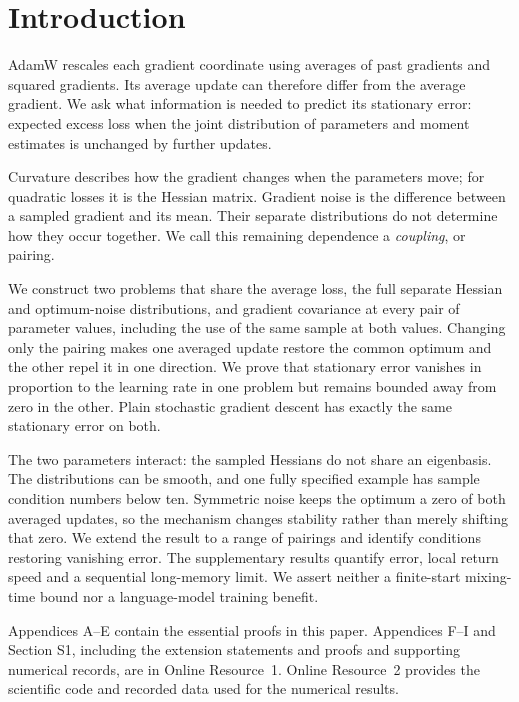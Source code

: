 


\section{Introduction}
AdamW rescales each gradient coordinate using averages of past gradients
and squared gradients. Its average update can therefore differ from the
average gradient. We ask what information is needed to predict its
stationary error: expected excess loss when the joint distribution of
parameters and moment estimates is unchanged by further updates.

Curvature describes how the gradient changes when the parameters move;
for quadratic losses it is the Hessian matrix. Gradient noise is the
difference between a sampled gradient and its mean. Their separate
distributions do not determine how they occur together. We call this
remaining dependence a \emph{coupling}, or pairing.

We construct two problems that share the average loss, the full separate
Hessian and optimum-noise distributions, and gradient covariance at every
pair of parameter values, including the use of the same sample at both
values. Changing only the pairing makes one averaged update restore the
common optimum and the other repel it in one direction. We prove that
stationary error vanishes in proportion to the learning rate in one
problem but remains bounded away from zero in the other. Plain stochastic
gradient descent has exactly the same stationary error on both.

The two parameters interact: the sampled Hessians do not share an
eigenbasis. The distributions can be smooth, and one fully specified
example has sample condition numbers below ten. Symmetric noise keeps
the optimum a zero of both averaged updates, so the mechanism changes
stability rather than merely shifting that zero. We extend the result
to a range of pairings and identify conditions restoring vanishing error.
The supplementary results quantify error, local return speed and a
sequential long-memory limit. We assert neither a finite-start mixing-time
bound nor a language-model training benefit.



Appendices A--E contain the essential proofs in this paper. Appendices
F--I and Section S1, including the extension statements and proofs and supporting numerical records, are
in Online Resource~1. Online Resource~2 provides the scientific code and
recorded data used for the numerical results.

